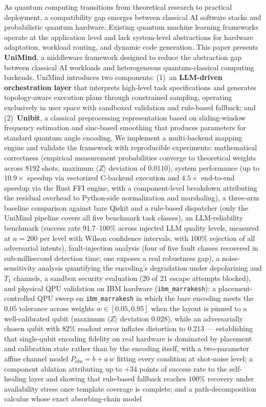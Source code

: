 ﻿\documentclass[12pt,a4paper]{article}
\begin{document}
\begin{titlepage}
\begin{minipage}{0.92\textwidth}
\small
As quantum computing transitions from theoretical research to practical deployment, a compatibility gap emerges between classical AI software stacks and probabilistic quantum hardware. Existing quantum machine learning frameworks operate at the application level and lack system-level abstractions for hardware adaptation, workload routing, and dynamic code generation. This paper presents \textbf{UniMind}, a middleware framework designed to reduce the abstraction gap between classical AI workloads and heterogeneous quantum-classical computing backends. UniMind introduces two components: (1)~an \textbf{LLM-driven orchestration layer} that interprets high-level task specifications and generates topology-aware execution plans through constrained sampling, operating exclusively in user space with sandboxed validation and rule-based fallback; and (2)~\textbf{Unibit}, a classical preprocessing representation based on sliding-window frequency estimation and sinc-based smoothing that produces parameters for standard quantum angle encoding. We implement a multi-backend mapping engine and validate the framework with reproducible experiments: mathematical correctness (empirical measurement probabilities converge to theoretical weights across 8192 shots, maximum $\langle Z \rangle$ deviation of $0.0110$), system performance (up to $10.9\times$ speedup via vectorized C-backend execution and $4.5\times$ end-to-end speedup via the Rust FFI engine, with a component-level breakdown attributing the residual overhead to Python-side normalization and marshaling), a three-arm baseline comparison against bare Qiskit and a rule-based dispatcher (only the UniMind pipeline covers all five benchmark task classes), an LLM-reliability benchmark (success rate 91.7--100\% across injected LLM quality levels, measured at $n{=}200$ per level with Wilson confidence intervals, with $100\%$ rejection of all adversarial intents), fault-injection analysis (four of five fault classes recovered in sub-millisecond detection time; one exposes a real robustness gap), a noise-sensitivity analysis quantifying the encoding's degradation under depolarizing and $T_1$ channels, a sandbox security evaluation (20 of 21 escape attempts blocked), and physical QPU validation on IBM hardware (\texttt{ibm\_marrakesh}): a placement-controlled QPU sweep on \texttt{ibm\_marrakesh} in which the bare encoding meets the $0.05$ tolerance across weights $w \in [0.05, 0.95]$ when the layout is pinned to a well-calibrated qubit (maximum $\langle Z \rangle$ deviation $0.028$), while an adversarially chosen qubit with $82\%$ readout error inflates distortion to $0.213$ --- establishing that single-qubit encoding fidelity on real hardware is dominated by placement and calibration state rather than by the encoding itself, with a two-parameter affine channel model $P_{\mathrm{obs}} = b + a\,w$ fitting every condition at shot-noise level; a component ablation attributing up to $+34$ points of success rate to the self-healing layer and showing that rule-based fallback reaches $100\%$ recovery under availability stress once template coverage is complete; and a path-decomposition calculus whose exact absorbing-chain model 
\end{minipage}
\end{titlepage}
\end{document}
